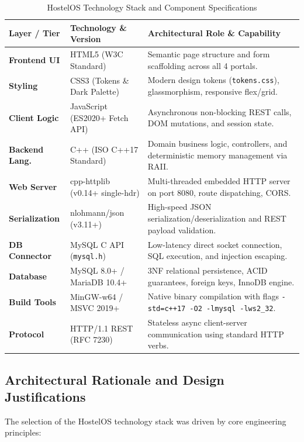 \documentclass[12pt,a4paper]{article}
\begin{document}
\begin{table}[H]
\centering
\footnotesize
\setlength{\tabcolsep}{5pt}
\renewcommand{\arraystretch}{1.1}
\begin{tabularx}{\textwidth}{p{2.5cm} p{3.6cm} X}
\toprule
\textbf{Layer / Tier} & \textbf{Technology \& Version} & \textbf{Architectural Role \& Capability} \\
\midrule
\textbf{Frontend UI}   & HTML5 (W3C Standard)            & Semantic page structure and form scaffolding across all 4 portals. \\
\textbf{Styling}       & CSS3 (Tokens \& Dark Palette)  & Modern design tokens (\texttt{tokens.css}), glassmorphism, responsive flex/grid. \\
\textbf{Client Logic}  & JavaScript (ES2020+ Fetch API)  & Asynchronous non-blocking REST calls, DOM mutations, and session state. \\
\textbf{Backend Lang.} & C++ (ISO C++17 Standard)        & Domain business logic, controllers, and deterministic memory management via RAII. \\
\textbf{Web Server}    & cpp-httplib (v0.14+ single-hdr) & Multi-threaded embedded HTTP server on port 8080, route dispatching, CORS. \\
\textbf{Serialization} & nlohmann/json (v3.11+)          & High-speed JSON serialization/deserialization and REST payload validation. \\
\textbf{DB Connector}  & MySQL C API (\texttt{mysql.h}) & Low-latency direct socket connection, SQL execution, and injection escaping. \\
\textbf{Database}      & MySQL 8.0+ / MariaDB 10.4+      & 3NF relational persistence, ACID guarantees, foreign keys, InnoDB engine. \\
\textbf{Build Tools}   & MinGW-w64 / MSVC 2019+          & Native binary compilation with flags \texttt{-std=c++17 -O2 -lmysql -lws2\_32}. \\
\textbf{Protocol}      & HTTP/1.1 REST (RFC 7230)        & Stateless async client-server communication using standard HTTP verbs. \\
\bottomrule
\end{tabularx}
\caption{HostelOS Technology Stack and Component Specifications}
\label{tab:tech_stack}
\end{table}

\subsection{Architectural Rationale and Design Justifications}
\label{sec:tech_justification}
The selection of the HostelOS technology stack was driven by core engineering principles:
\end{document}
